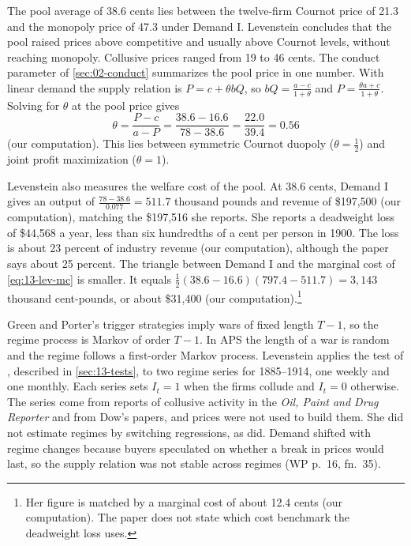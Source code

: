 The pool average of 38.6 cents lies between the twelve-firm Cournot price of 21.3 and the monopoly price of 47.3
under Demand I. Levenstein concludes that the pool raised prices above competitive and usually above Cournot
levels, without reaching monopoly. Collusive prices ranged from 19 to 46 cents. The conduct parameter of
\cref{sec:02-conduct} summarizes the pool price in one number. With linear demand the supply relation is
$P = c + \theta bQ$, so $bQ = \frac{a - c}{1 + \theta}$ and $P = \frac{\theta a + c}{1 + \theta}$. Solving for
$\theta$ at the pool price gives
\begin{equation*}
  \theta = \frac{P - c}{a - P} = \frac{38.6 - 16.6}{78 - 38.6} = \frac{22.0}{39.4} = 0.56
\end{equation*}
(our computation). This lies between symmetric Cournot duopoly ($\theta = \frac{1}{2}$) and joint profit
maximization ($\theta = 1$).

Levenstein also measures the welfare cost of the pool. At 38.6 cents, Demand I gives an output of
$\frac{78 - 38.6}{0.077} = 511.7$ thousand pounds and revenue of \$197,500 (our computation), matching the
\$197,516 she reports. She reports a deadweight loss of \$44,568 a year, less than six
hundredths of a cent per person in 1900. The loss is about 23 percent of industry revenue (our computation), although
the paper says about 25 percent. The triangle between Demand I and the marginal cost of
\eqref{eq:13-lev-mc} is smaller. It equals $\frac{1}{2}(38.6 - 16.6)(797.4 - 511.7) = 3{,}143$ thousand
cent-pounds, or about \$31,400 (our computation).\footnote{Her figure is matched by a marginal cost of about 12.4
cents (our computation). The paper does not state which cost benchmark the deadweight loss uses.}

Green and Porter's trigger strategies imply wars of fixed length $T-1$, so the regime process is Markov of order
$T-1$. In APS the length of a war is random and the regime follows a first-order Markov process. Levenstein applies
the test of \citet{BerryBriggs1988}, described in \cref{sec:13-tests}, to two regime series for 1885--1914, one
weekly and one monthly. Each series sets $I_t = 1$ when the firms collude and $I_t = 0$ otherwise. The series
come from reports of collusive activity in the \textit{Oil, Paint and Drug Reporter} and from Dow's papers, and
prices were not used to build them. She did not estimate regimes by switching regressions, as \citet{Porter1983}
did. Demand shifted with regime changes because buyers speculated on whether a break in prices would last, so
the supply relation was not stable across regimes (WP p.~16, fn.~35).

